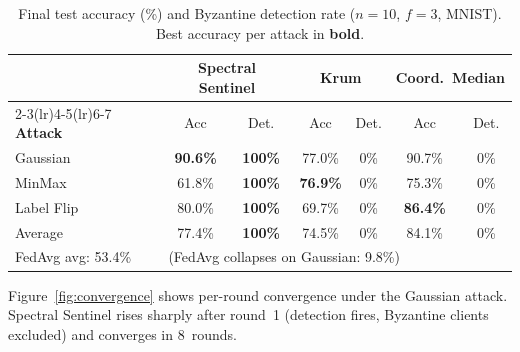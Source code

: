 \documentclass[runningheads]{llncs}
\begin{document}
\begin{table}[htbp]
\centering
\caption{Final test accuracy (\%) and Byzantine detection rate ($n=10$, $f=3$, MNIST). Best accuracy per attack in \textbf{bold}.}
\label{tab:accuracy_comparison}
\setlength{\tabcolsep}{5pt}
\begin{tabular}{lcccccc}
\toprule
& \multicolumn{2}{c}{\textbf{Spectral Sentinel}} & \multicolumn{2}{c}{\textbf{Krum}} & \multicolumn{2}{c}{\textbf{Coord.\ Median}} \\
\cmidrule(lr){2-3}\cmidrule(lr){4-5}\cmidrule(lr){6-7}
\textbf{Attack} & Acc & Det. & Acc & Det. & Acc & Det. \\
\midrule
Gaussian  & \textbf{90.6\%} & \textbf{100\%} & 77.0\% & 0\% & 90.7\% & 0\% \\
MinMax    & 61.8\% & \textbf{100\%} & \textbf{76.9\%} & 0\% & 75.3\% & 0\% \\
Label Flip & 80.0\% & \textbf{100\%} & 69.7\% & 0\% & \textbf{86.4\%} & 0\% \\
\midrule
Average   & 77.4\% & \textbf{100\%} & 74.5\% & 0\% & 84.1\% & 0\% \\
FedAvg avg: 53.4\% & \multicolumn{6}{l}{(FedAvg collapses on Gaussian: 9.8\%)} \\
\bottomrule
\end{tabular}
\end{table}

Figure~\ref{fig:convergence} shows per-round convergence under the Gaussian attack. Spectral Sentinel rises sharply after round~1 (detection fires, Byzantine clients excluded) and converges in 8~rounds.
\end{document}
